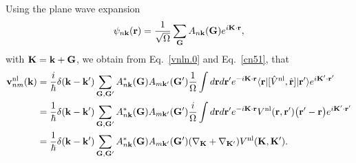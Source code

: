 Using the 
plane wave expansion
\begin{align}\label{cn3}
\psi_{n\mathbf{k}}(\mathbf{r})=\frac{1}{\sqrt{\Omega}}
\sum_{\mathbf{G}} A_{n\mathbf{k}}(\mathbf{G})e^{i\mathbf{K}\cdot\mathbf{r}}
,
\end{align}
with $\mathbf{K}=\mathbf{k}+\mathbf{G}$, we
obtain from Eq.~\eqref{vnln.0} and Eq.~\eqref{cn51}, that
\begin{align}\label{vnln.2}
\mathbf{v}^{\mathrm{nl}}_{nm}(\mathbf{k})
&=
\frac{i}{\hbar}
\delta(\mathbf{k}-\mathbf{k}')
\sum_{\mathbf{G},\mathbf{G}'}
A^*_{n\mathbf{k}}(\mathbf{G}) 
A_{m\mathbf{k}'}(\mathbf{G}')
\frac{1}{\Omega}
\int d\mathbf{r} d\mathbf{r}'
e^{-i\mathbf{K}\cdot\mathbf{r}}
\langle \mathbf{r} |
[\hat V^{\mathrm{nl}},\hat {\mathbf{r}}]
| \mathbf{r}' \rangle
e^{i\mathbf{K}'\cdot\mathbf{r}'}
\nonumber\\
&=
\frac{1}{\hbar}
\delta(\mathbf{k}-\mathbf{k}')
\sum_{\mathbf{G},\mathbf{G}'}
A^*_{n\mathbf{k}}(\mathbf{G}) 
A_{m\mathbf{k}'}(\mathbf{G}')
\frac{i}{\Omega}
\int d\mathbf{r} d\mathbf{r}'
e^{-i\mathbf{K}\cdot\mathbf{r}}
V^{\mathrm{nl}}(\mathbf{r},\mathbf{r}')
\big(\mathbf{r}'-\mathbf{r}\big)
e^{i\mathbf{K}'\cdot\mathbf{r}'}
\nonumber\\
&=
\frac{1}{\hbar}
\delta(\mathbf{k}-\mathbf{k}')
\sum_{\mathbf{G},\mathbf{G}'}
A^*_{n\mathbf{k}}(\mathbf{G}) 
A_{m\mathbf{k}'}(\mathbf{G}')
(\nabla_{\mathbf{K}}+\nabla_{\mathbf{K}'})
V^{\mathrm{nl}}(\mathbf{K},\mathbf{K}')
.
\end{align}  

